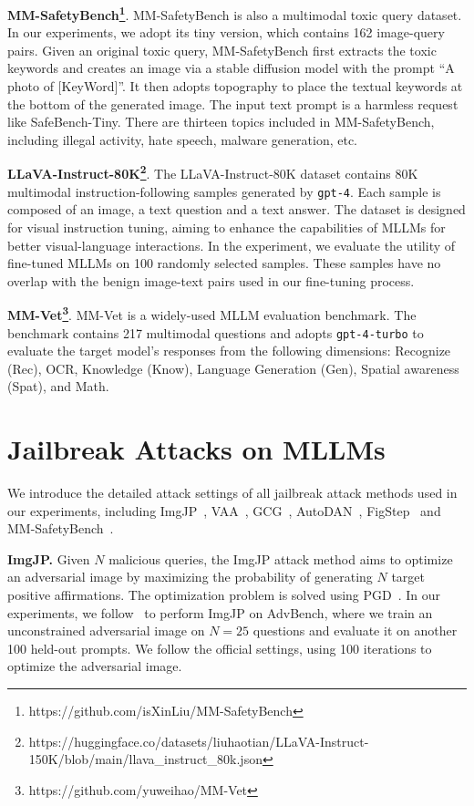 \textbf{MM-SafetyBench\footnote{https://github.com/isXinLiu/MM-SafetyBench}}. MM-SafetyBench is also a multimodal toxic query dataset. In our experiments, we adopt its tiny version, which contains 162 image-query pairs. 
Given an original toxic query, MM-SafetyBench first extracts the toxic keywords and creates an image via a stable diffusion model with the prompt ``A photo of [KeyWord]''.
It then adopts topography to place the textual keywords at the bottom of the generated image. The input text prompt is a harmless request like SafeBench-Tiny. There are thirteen topics included in MM-SafetyBench, including illegal activity, hate speech, malware generation, etc.


\textbf{LLaVA-Instruct-80K\footnote{https://huggingface.co/datasets/liuhaotian/LLaVA-Instruct-150K/blob/main/llava\_instruct\_80k.json}}. 
The LLaVA-Instruct-80K dataset contains 80K multimodal instruction-following samples generated by \texttt{gpt-4}. Each sample is composed of an image, a text question and a text answer. The dataset is designed for visual instruction tuning, aiming to enhance the capabilities of MLLMs for better visual-language interactions. In the experiment, we evaluate the utility of fine-tuned MLLMs on 100 randomly selected samples. These samples have no overlap with the benign image-text pairs used in our fine-tuning process.

\textbf{MM-Vet\footnote{https://github.com/yuweihao/MM-Vet}}. 
 MM-Vet is a widely-used MLLM evaluation benchmark. The benchmark contains 217 multimodal questions and adopts \texttt{gpt-4-turbo} to evaluate the target model’s responses from the following dimensions: Recognize (Rec), OCR, Knowledge (Know), Language Generation (Gen), Spatial awareness (Spat), and Math. 

\section{Jailbreak Attacks on MLLMs}\label{app:mllms}
We introduce the detailed attack settings of all jailbreak attack methods used in our experiments, including ImgJP~\citep{niu2024jailbreaking}, VAA~\citep{qi2024visual}, GCG~\citep{zou2023universal}, AutoDAN~\citep{liuautodan}, FigStep~\citep{gong2023figstep} and MM-SafetyBench~\citep{liu2023mm}.

\textbf{ImgJP.} Given $N$ malicious queries, the ImgJP attack method aims to optimize an adversarial image by maximizing the probability of generating $N$ target positive affirmations. The optimization problem is solved using PGD~\citep{DBLP:conf/iclr/MadryMSTV18}. In our experiments, we follow~\cite{niu2024jailbreaking} to perform ImgJP on AdvBench, where we train an unconstrained adversarial image on $N=25$ questions and evaluate it on another 100 held-out prompts. We follow the official settings, using 100 iterations to optimize the adversarial image. 

